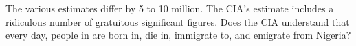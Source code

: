 The various estimates differ by 5 to 10 million. The
CIA's estimate includes a ridiculous number of gratuitous
significant figures. Does the CIA understand that every
day, people in are born in, die in,  immigrate to, and
emigrate from Nigeria?



